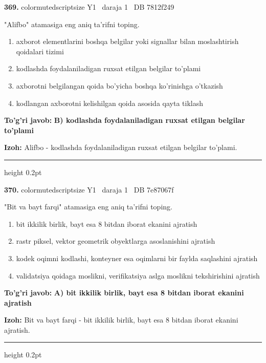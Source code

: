 \documentclass[10pt,a4paper,oneside]{article}
\begin{document}
\noindent\textbf{\color{ink}369.}  {color{muted}scriptsize Y1 \textbullet\ daraja 1 \textbullet\ DB 7812f249}
\par
"Alifbo" atamasiga eng aniq ta'rifni toping.
\begin{enumerate}[label=\Alph*),leftmargin=9mm]
\item axborot elementlarini boshqa belgilar yoki signallar bilan moslashtirish qoidalari tizimi
\item kodlashda foydalaniladigan ruxsat etilgan belgilar to'plami
\item axborotni belgilangan qoida bo'yicha boshqa ko'rinishga o'tkazish
\item kodlangan axborotni kelishilgan qoida asosida qayta tiklash
\end{enumerate}
\begin{tcolorbox}[enhanced,breakable,colback=teal!4,colframe=teal!50!black,boxrule=0.5pt,arc=1.1mm,left=3mm,right=3mm,top=1.7mm,bottom=1.7mm,before skip=2mm,after skip=2mm]
\textbf{\color{teal}To'g'ri javob:} \textbf{B) kodlashda foydalaniladigan ruxsat etilgan belgilar to'plami}
\par\smallskip
\textbf{Izoh:} Alifbo - kodlashda foydalaniladigan ruxsat etilgan belgilar to'plami.
\end{tcolorbox}
\vspace{2mm}\hrule height 0.2pt \vspace{3mm}

\noindent\textbf{\color{ink}370.}  {color{muted}scriptsize Y1 \textbullet\ daraja 1 \textbullet\ DB 7e87067f}
\par
"Bit va bayt farqi" atamasiga eng aniq ta'rifni toping.
\begin{enumerate}[label=\Alph*),leftmargin=9mm]
\item bit ikkilik birlik, bayt esa 8 bitdan iborat ekanini ajratish
\item rastr piksel, vektor geometrik obyektlarga asoslanishini ajratish
\item kodek oqimni kodlashi, konteyner esa oqimlarni bir faylda saqlashini ajratish
\item validatsiya qoidaga moslikni, verifikatsiya aslga moslikni tekshirishini ajratish
\end{enumerate}
\begin{tcolorbox}[enhanced,breakable,colback=teal!4,colframe=teal!50!black,boxrule=0.5pt,arc=1.1mm,left=3mm,right=3mm,top=1.7mm,bottom=1.7mm,before skip=2mm,after skip=2mm]
\textbf{\color{teal}To'g'ri javob:} \textbf{A) bit ikkilik birlik, bayt esa 8 bitdan iborat ekanini ajratish}
\par\smallskip
\textbf{Izoh:} Bit va bayt farqi - bit ikkilik birlik, bayt esa 8 bitdan iborat ekanini ajratish.
\end{tcolorbox}
\vspace{2mm}\hrule height 0.2pt \vspace{3mm}
\end{document}
